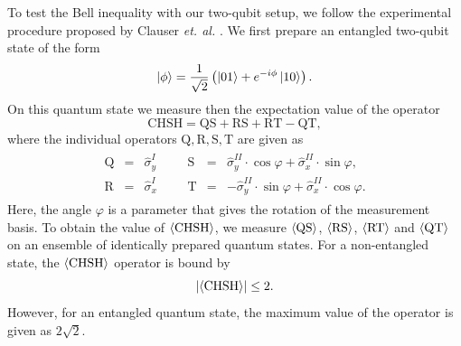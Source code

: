 To test the Bell inequality \citep{einstein_can_1935,bell_einstein_1964} with our two-qubit setup, we follow the experimental procedure proposed by Clauser {\it et. al.} \citep{clauser_proposed_1969,freedman_experimental_1972,aspect_experimental_1982}. We first prepare an entangled two-qubit state of the form
%
\begin{equation}
\left| \phi \right> = \frac{1}{\sqrt{2}}\left(\left| 01 \right>+e^{-i\phi}\left| 10 \right>\right). \label{eq:chsh_state}
\end{equation}
%
On this quantum state we measure then the expectation value of the operator
%
\begin{equation}
\mathrm{CHSH} = \mathrm{QS}+\mathrm{RS}+\mathrm{RT}-\mathrm{QT},
\end{equation}
%
where the individual operators $\mathrm{Q,R,S,T}$ are given as
%
\begin{eqnarray}
	\begin{array}{cccccccc}
		\mathrm{Q} & = & \hat{\sigma}_y^I &&& \mathrm{S} & = & \hat{\sigma}_y^{II}\cdot \cos{\varphi}+\hat{\sigma}_x^{II} \cdot \sin{\varphi}, \\
		\mathrm{R} & = & \hat{\sigma}_x^I &&& \mathrm{T} & = & -\hat{\sigma}_y^{II}\cdot \sin{\varphi}+\hat{\sigma}_x^{II} \cdot \cos{\varphi}.
	\end{array}
\end{eqnarray} 
%
Here, the angle $\varphi$ is a parameter that gives the rotation of the measurement basis. To obtain the value of $\left< \mathrm{CHSH} \right>$, we measure $\left< \mathrm{QS} \right>$, $\left< \mathrm{RS} \right>$, $\left< \mathrm{RT} \right>$ and $\left< \mathrm{QT} \right>$ on an ensemble of identically prepared quantum states. For a non-entangled state, the $\left< \mathrm{CHSH} \right>$ operator is bound by
%
\begin{equation}
\left|\left< \mathrm{CHSH} \right>\right| \le 2. \label{eq:chsh_max}
\end{equation}
%
However, for an entangled quantum state, the maximum value of the operator is given as $2\sqrt{2}$. 

\smallskip

